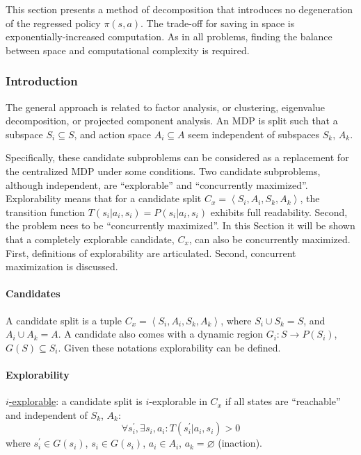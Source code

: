 This section presents a method of decomposition that introduces no degeneration of the regressed policy $\pi(s,a)$.
The trade-off for saving in space is exponentially-increased computation. As in all problems, finding the balance between space and computational complexity is required.

 

\subsubsection{Introduction}

The general approach is related to factor analysis, or clustering, eigenvalue decomposition, or projected component analysis. An MDP is split such that a subspace $S_i \subseteq S$, and action space $A_i \subseteq A$ seem independent of subspaces $S_k$, $A_k$.

Specifically, these candidate subproblems can be considered as a replacement for the centralized MDP under some conditions. Two candidate subproblems, although independent, are ``explorable''
and ``concurrently maximized''. Explorability means that for a candidate split $C_x=\left\langle S_i, A_i, S_k, A_k \right\rangle$, the transition function $T( s_i | a_i, s_i) = P( s_i | a_i, s_i )$ exhibits full readability.  Second, the problem nees to be ``concurrently maximized''.  In this Section it will be shown that a completely explorable candidate, $C_x$, can also be concurrently maximized. First, definitions of explorability are articulated. Second, concurrent maximization is discussed.

\paragraph{Candidates}

A candidate split is a tuple $C_x=\left\langle S_i, A_i, S_k, A_k \right\rangle$, where $S_i \cup S_k = S$, and $A_i \cup A_k = A$. A candidate also comes with a dynamic region $G_i: S \to P( S_i )$, $G( S ) \subseteq S_i$. Given these notations explorability can be defined.

\paragraph{Explorability}

\underline{$i$-explorable}: a candidate split is $i$-explorable in $C_x$ if all states are ``reachable'' and independent of $S_k$, $A_k$:
\begin{equation*}
\forall s_i^\prime, \exists s_i, a_i: T(s_i^\prime | a_i, s_i ) >0
\end{equation*}
where $s_i^\prime \in G( s_i )$, $s_i \in G( s_i )$, $a_i \in A_i$, $a_k= \varnothing$ (inaction).

